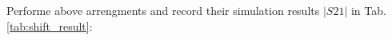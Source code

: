 Performe above arrengments and record their simulation results $|S21|$ in Tab. \ref{tab:shift_result}:
%
%

